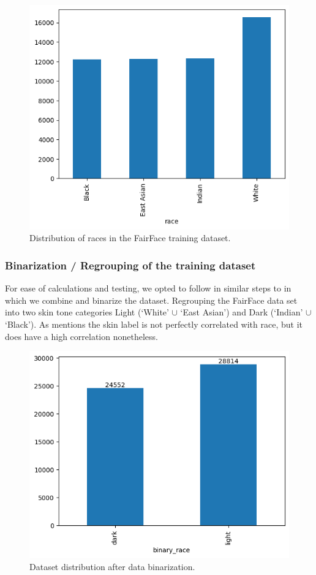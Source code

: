 \documentclass[conference]{IEEEtran}
\begin{document}
\begin{figure}[hbt!]
    \centerline{\includegraphics[width=0.8\linewidth]{latex/images/fairFaceOriginalDistribution.png}}
    \caption{Distribution of races in the FairFace training dataset.}
    \label{racial_distribution}
\end{figure}

\subsubsection{Binarization / Regrouping of the training dataset}
For ease of calculations and testing, we opted to follow in similar steps to\cite{dhar2022distill} in which we combine and binarize the dataset. Regrouping the FairFace\cite{karkkainen2021fairface} data set into two skin tone categories Light (‘White’ $\cup$ ‘East Asian’) and Dark (‘Indian’ $\cup$ ‘Black’). As \cite{dhar2022distill} mentions the skin label is not perfectly correlated with race, but it does have a high correlation nonetheless. 

\begin{figure}[hbt!]
    \centerline{\includegraphics[width=0.8\linewidth]{latex/images/RegroupDistributionFairFace.png}}
    \caption{Dataset distribution after data binarization.}
    \label{binarized_data}
\end{figure}
\end{document}
